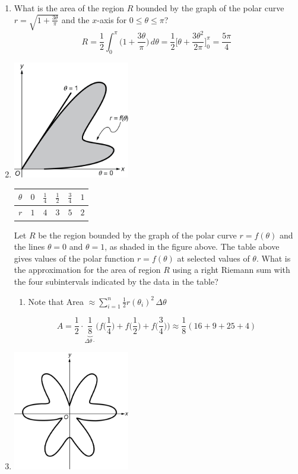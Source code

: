 \documentclass[12pt]{article}
\begin{document}
\begin{enumerate}
	\item What is the area of the region $R$ bounded by the graph of the polar curve $r=\sqrt{1+\frac{3\theta}{\pi}}$ and the $x$-axis for $0\leq\theta\leq\pi$?
	$$R = \frac{1}{2} \int_{0}^{\pi} \bigg(1+\frac{3\theta}{\pi}\bigg) \, d\theta = \frac{1}{2} \bigg[\theta + \frac{3\theta^2}{2\pi}\bigg]_{0}^{\pi} = \boxed{\frac{5\pi}{4}}$$
	\item 
	      \begin{center}
	      	\includegraphics[width = 2in]{7.035}
	      \end{center}
	      \begin{table}[h]
	      	\centering
	      	\begin{tabular}{c|c|c|c|c|c}
	      		$\theta$ & $0$ & $\frac{1}{4}$ & $\frac{1}{2}$ & $\frac{3}{4}$ & $1$ \\ \hline
	      		$r$      & $1$ & $4$           & $3$           & $5$           & $2$ 
	      	\end{tabular}
	      \end{table}
	      Let $R$ be the region bounded by the graph of the polar curve $r=f(\theta)$ and the lines $\theta=0$ and $\theta=1$, as shaded in the figure above. The table above gives values of the polar function $r=f(\theta)$ at selected values of $\theta$. What is the approximation for the area of region $R$ using a right Riemann sum with the four subintervals indicated by the data in the table?
		  \begin{enumerate}
			\item Note that Area $\approx \sum_{i=1}^{n} \frac{1}{2} r(\theta_i)^2 \, \Delta \theta$
		  \end{enumerate}
		  $$A = \frac{1}{2}\cdot \underbrace{\frac{1}{8}}_{\Delta\theta \cdot}\biggr(f\Big(\frac{1}{4}\Big)+f\Big(\frac{1}{2}\Big) + f\Big(\frac{3}{4}\Big)\biggr) \approx \boxed{\frac{1}{8}(16+9+25+4)}$$
	\item 
	      \begin{center}
	      	\includegraphics[width = 2in]{7.036}

\end{center}
\end{enumerate}
\end{document}
